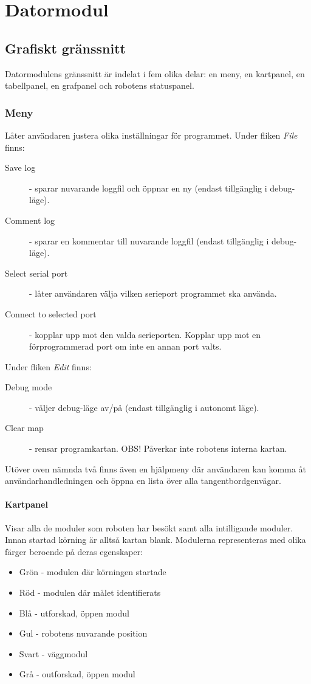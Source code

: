 \documentclass[11pt]{article}
\begin{document}
\section{Datormodul}
\subsection{Grafiskt gränssnitt}
Datormodulens gränssnitt är indelat i fem olika delar: en meny, en kartpanel, en tabellpanel, en grafpanel och robotens statuspanel.

\subsubsection{Meny} Låter användaren justera olika inställningar för programmet. Under fliken \emph{File}  finns:
\begin{description}
	\item[Save log] - sparar nuvarande loggfil och öppnar en ny (endast tillgänglig i debug-läge).
	\item[Comment log] - sparar en kommentar till nuvarande loggfil (endast tillgänglig i debug-läge).
	\item[Select serial port] - låter användaren välja vilken serieport programmet ska använda.
	\item[Connect to selected port] - kopplar upp mot den valda serieporten. Kopplar upp mot en förprogrammerad port om inte en annan port valts. 
\end{description}

Under fliken \emph{Edit} finns:
\begin{description}
	\item[Debug mode] - väljer debug-läge av/på (endast tillgänglig i autonomt läge).
	\item [Clear map] - rensar programkartan. OBS! Påverkar inte robotens interna kartan.
\end{description}

Utöver oven nämnda två finns även en hjälpmeny där användaren kan komma åt användarhandledningen och öppna en lista över alla tangentbordgenvägar.

\paragraph{Kartpanel} Visar alla de moduler som roboten har besökt samt alla intilligande moduler. Innan startad körning är alltså kartan blank. Modulerna representeras med olika färger beroende på deras egenskaper:
\begin{itemize}
	\item Grön - modulen där körningen startade
	\item Röd - modulen där målet identifierats
	\item Blå - utforskad, öppen modul
	\item Gul - robotens nuvarande position
	\item Svart - väggmodul
	\item Grå - outforskad, öppen modul
\end{itemize}
\end{document}
